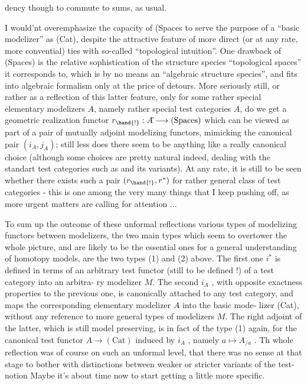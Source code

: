 dency though to commute to sums,  as usual.

I would'nt overemphasize the capacity of (Spaces to serve the purpose
of a ``basic modelizer'' as  (Cat),  despite the attractive feature of more
direct (or at any rate,  more convential) ties with so-called ``topological
intuition''.  One drawback of (Spaces) is the relative sophistication of
the structure species ``topological spaces'' it corresponds to,  which is
by no means an ``algebraic structure species'',  and fits into algebraic
formalism only at the price of detours.  More seriously still,  or rather
as a reflection of this latter feature,  only for some rather special
elementary modelizers $A\hat{}$,  namely rather special test categories $A$,  do
we get a geometric realization functor $r_{\hand{!}} : A\hat{} \longrightarrow (\mathrm{Spaces})$ which can be
viewed as part of a pair of mutually adjoint modelizing functors,
mimicking the canonical pair $(i_A, j_A)$;  still less does there seem to be
anything like a really canonical choice (although some choices are pretty
natural indeed,  dealing with the standart test categories such as \hand{$\Delta$} and
its variants).  At any rate,  it is still to be seen whether there exists
such a pair  $(r_{\hand{!}}, r^{*})$  for  rather general class of test categories  -
this is one among the very many things that I keep pushing off,  as more
urgent matters are calling for attention ...

To sum up the outcome of these unformal reflections  various
types of modelizing functors between modelizers,  the two main types which
seem to overtower the whole picture,  and are likely to be the essential
ones for a general understanding of homotopy models,  are the two types
(1) and (2)  above.  The first one $i^{*}$ is defined in terms of an arbitrary
test functor (still to be def\hand{\unsure{-}}ined !)  of a test category into an arbitra-%
ry modelizer $M$.  The second $i_A$ ,  with opposite exactness properties to
the previous one,  is canonically attached to any test category,  and
 maps the corresponding elementary modelizer  $A\hat{}$ into the basic mode-%
lizer (Cat),  without any reference to more general types of modelizers $M$.
The right adjoint of the latter,  which is still model preserving,  is
in fact of the type (1) again,  for the canonical test functor $A \longrightarrow (\mathrm{Cat})$
induced by $i_A$ ,  namely $a \mapsto A_{/a}$ .   Th whole reflection was of course on
such an unformal level,  that there was no sense at that stage to bother
with distinctions between weaker or stricter  variants of the test-notion
Maybe it's about time now to start getting a little more specific.

